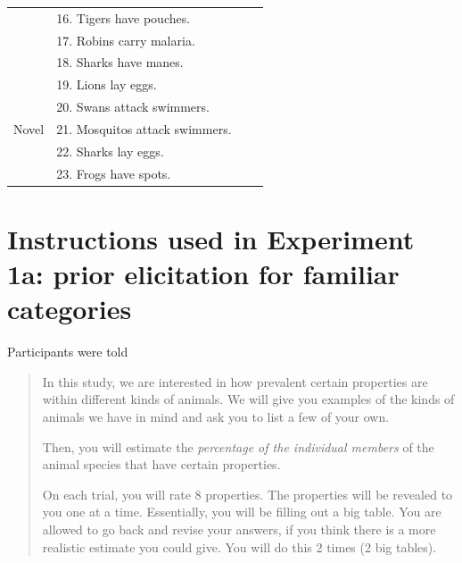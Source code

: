 \documentclass[10pt,letterpaper]{article}
\begin{document}
\begin{table}[h]
\begin{tabular}{| l || l | l | l |}
                                              & 16.  Tigers have pouches.                       &                &                     \\
                                              & 17.  Robins carry malaria.                       &                &                     \\
                                              & 18. Sharks have manes.                       &                &                     \\
                                              & 19. Lions lay eggs.                       &                &                     \\
                                              & 20. Swans attack swimmers.                       &                &                     \\
Novel                         & 21. Mosquitos attack swimmers.       &                &                    \\
                         & 22. Sharks lay eggs.       &                &                    \\
                         & 23. Frogs have spots.       &                &                   \\
\hline

\end{tabular}
\end{table}


\section{Instructions used in Experiment 1a: prior elicitation for familiar categories}
\label{sec:prior1instruct}

Participants were told 
\begin{quote}
In this study, we are interested in how prevalent certain properties are within different kinds of animals. We will give you examples of the kinds of animals we have in mind and ask you to list a few of your own.

Then, you will estimate the \emph{percentage of the individual members} of the animal species that have certain properties.

On each trial, you will rate 8 properties. The properties will be revealed to you one at a time. Essentially, you will be filling out a big table. You are allowed to go back and revise your answers, if you think there is a more realistic estimate you could give. You will do this 2 times (2 big tables). 

\end{quote}
\end{document}
